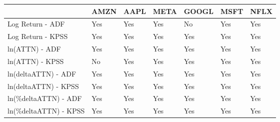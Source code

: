 \begin{tabular}{lllllll}
\toprule
{} & AMZN & AAPL & META & GOOGL & MSFT & NFLX \\
\midrule
Log Return - ADF      &  Yes &  Yes &  Yes &    No &  Yes &  Yes \\
Log Return - KPSS     &  Yes &  Yes &  Yes &   Yes &  Yes &  Yes \\
ln(ATTN) - ADF        &  Yes &  Yes &  Yes &   Yes &  Yes &  Yes \\
ln(ATTN) - KPSS       &   No &  Yes &  Yes &   Yes &  Yes &  Yes \\
ln(deltaATTN) - ADF   &  Yes &  Yes &  Yes &   Yes &  Yes &  Yes \\
ln(deltaATTN) - KPSS  &  Yes &  Yes &  Yes &   Yes &  Yes &  Yes \\
ln(\%deltaATTN) - ADF  &  Yes &  Yes &  Yes &   Yes &  Yes &  Yes \\
ln(\%deltaATTN) - KPSS &  Yes &  Yes &  Yes &   Yes &  Yes &  Yes \\
\bottomrule
\end{tabular}

